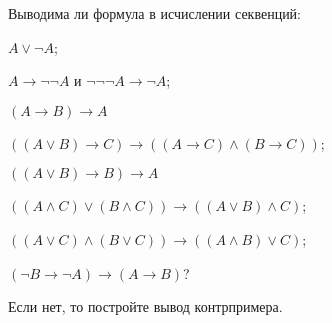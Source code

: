 Выводима ли формула в исчислении секвенций:
\begin{enumcyr}
    \item $A \lor \lnot A$;
    \item $A \to \lnot \lnot A$ и $\lnot \lnot \lnot A \to \lnot A$;
    \item $(A \to B) \to A$
    \item $((A \lor B) \to C) \to ((A \to C) \land (B \to C))$;
    \item $((A \lor B) \to B) \to A$
    \item $((A \land C) \lor (B \land C)) \to ((A \lor B) \land C)$;
    \item $((A \lor C) \land (B \lor C)) \to ((A \land B) \lor C)$;
    \item $(\lnot B \to \lnot A) \to (A \to B)$?
\end{enumcyr}

Если нет, то постройте вывод контрпримера.